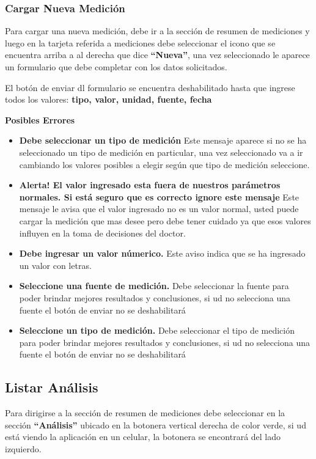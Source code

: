 \documentclass[a4paper,12pt]{article}
\begin{document}
\subsubsection{Cargar Nueva Medición}
Para cargar una nueva medición, debe ir a la sección de resumen de mediciones y luego en la tarjeta referida a mediciones debe seleccionar el icono que se encuentra arriba a al derecha que dice \textbf{``Nueva''}, una vez seleccionado le aparece un formulario que debe completar con los datos solicitados.

El botón de enviar dl formulario se encuentra deshabilitado hasta que ingrese todos los valores:
\textbf{tipo, valor, unidad, fuente, fecha}


\textbf{Posibles Errores}
\begin{itemize}
	\item \textbf{Debe seleccionar un tipo de medición} Este mensaje aparece si no se ha seleccionado un tipo de medición en particular, una vez seleccionado va a ir cambiando los valores posibles a elegir según que tipo de medición seleccione.
	\item \textbf{Alerta! El valor ingresado esta fuera de nuestros parámetros normales. Si está seguro que es correcto ignore este mensaje} Este mensaje le avisa que el valor ingresado no es un valor normal, usted puede cargar la medición que mas desee pero debe tener cuidado ya que esos valores influyen en la toma de decisiones del doctor.
	\item \textbf{Debe ingresar un valor númerico.} Este aviso indica que se ha ingresado un valor con letras.
	\item \textbf{Seleccione una fuente de medición.} Debe seleccionar la fuente para poder brindar mejores resultados y conclusiones, si ud no selecciona una fuente el botón de enviar no se deshabilitará
	\item \textbf{Seleccione un tipo de medición.} Debe seleccionar el tipo de medición para poder brindar mejores resultados y conclusiones, si ud no selecciona una fuente el botón de enviar no se deshabilitará
\end{itemize}


\subsection{Listar Análisis}
Para dirigirse a la sección de resumen de mediciones debe seleccionar en la sección \textbf{``Análisis''} ubicado en la botonera vertical derecha de color verde, si ud está viendo la aplicación en un celular, la botonera se encontrará del lado izquierdo.
\end{document}

